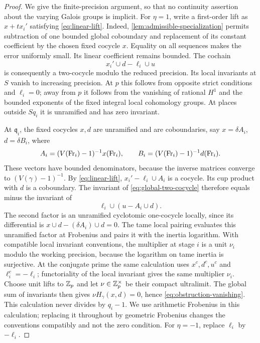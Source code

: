 \begin{proof}
We give the finite-precision argument, so that no continuity
assertion about the varying Galois groups is implicit.  For
$\eta=1$, write a first-order lift as $x+t x_i'$ satisfying
\cref{eq:linear-lift}.  Indeed,
\cref{lem:admissible-specialization} permits subtraction of one
bounded global coboundary and replacement of its constant
coefficient by the chosen fixed cocycle $x$.  Equality on all
sequences makes the error uniformly small.  Its linear coefficient
remains bounded.  The cochain
\begin{equation}\label{eq:global-two-cocycle}
 x_i'\cup d-\ell_i\cup u
\end{equation}
is consequently a two-cocycle modulo the reduced precision.
Its local invariants at $S$ vanish to increasing precision.  At
$p$ this follows from opposite strict conditions and $\ell_i=0$;
away from $p$ it follows from the vanishing of rational $H^1$ and
the bounded exponents of the fixed integral local cohomology
groups.  At places outside $S q_i$ it is unramified and has zero
invariant.

At $\mathfrak q_i$, the fixed cocycles $x,d$ are unramified and
are coboundaries, say $x=\delta A_i$, $d=\delta B_i$, where
\[
 A_i=(V(\operatorname{Fr}_i)-1)^{-1}x(\operatorname{Fr}_i),\qquad
 B_i=(V(\operatorname{Fr}_i)-1)^{-1}d(\operatorname{Fr}_i).
\]
These vectors have bounded denominators, because the inverse
matrices converge to $(V(\gamma)-1)^{-1}$.  By
\cref{eq:linear-lift}, $x_i'-\ell_i\cup A_i$ is a cocycle.
Its cup product with $d$ is a coboundary.  The invariant of
\cref{eq:global-two-cocycle} therefore equals minus the invariant
of
\begin{equation}\label{eq:tame-corrected-cup}
 \ell_i\cup(u-A_i\cup d).
\end{equation}
The second factor is an unramified cyclotomic one-cocycle locally,
since its differential is $x\cup d-(\delta A_i)\cup d=0$.
The tame local pairing evaluates this unramified factor at
Frobenius and pairs it with the inertia logarithm.  With compatible
local invariant conventions, the multiplier at stage $i$ is a unit
$\nu_i$ modulo the working precision, because the logarithm on tame
inertia is surjective.  At the conjugate prime the same calculation
uses $x^c,d^c,u^c$ and $\ell_i^c=-\ell_i$; functoriality of the local
invariant gives the same multiplier $\nu_i$.  Choose unit lifts to
$\mathbb Z_p$ and let $\nu\in\mathbb Z_p^\times$ be their compact ultralimit.
The global sum of invariants then gives $\nu H_\gamma(x,d)=0$,
hence \cref{eq:obstruction-vanishing}.  This calculation never
divides by $q_i-1$.  We use arithmetic Frobenius
in this calculation; replacing it throughout by geometric
Frobenius changes the conventions compatibly and not the zero
condition.  For $\eta=-1$, replace $\ell_i$ by $-\ell_i$.


\end{proof}
